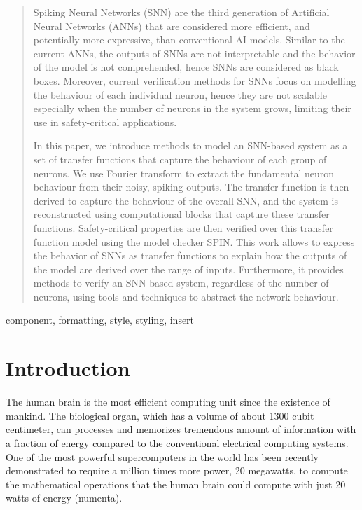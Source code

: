 \documentclass[conference]{IEEEtran}
\begin{document}
\begin{abstract}
Spiking Neural Networks (SNN) are the third generation of Artificial Neural Networks (ANNs) that are considered 
more efficient, and potentially more expressive, than conventional AI models. Similar to the current ANNs, the outputs of SNNs are not interpretable and the behavior of the model is not comprehended, hence SNNs are considered as black boxes.
Moreover, current verification methods for SNNs focus on modelling the behaviour of each individual neuron, hence they are not scalable especially when
the number of neurons in the system grows, limiting their use in safety-critical applications.
    
In this paper, we introduce methods to model an SNN-based
system as a set of transfer functions that capture the behaviour
of each group of neurons. We use Fourier transform to extract the
fundamental neuron behaviour from their noisy, spiking outputs. 
The transfer function is then derived to capture the behaviour of the overall SNN, 
and the system is reconstructed using computational blocks that capture these transfer functions. 
Safety-critical properties are then verified over this transfer function model using the model checker SPIN.
This work allows to express the behavior of SNNs as transfer functions to explain how the outputs of the model are derived over the range of inputs.
Furthermore, it provides methods to verify an SNN-based system, regardless of the number of neurons, using tools and techniques to abstract the network behaviour.
\end{abstract}

\begin{IEEEkeywords}
component, formatting, style, styling, insert
\end{IEEEkeywords}

\section{Introduction}
The human brain is the most efficient computing unit since the existence of mankind.
The biological organ, which has a volume of about 1300 cubit centimeter, can processes and memorizes tremendous amount of information with
a fraction of energy compared to the conventional electrical computing systems. One of the most powerful supercomputers in the world has been
recently demonstrated to require a million times more power, 20 megawatts, to compute the mathematical operations that the human brain could compute 
with just 20 watts of energy (numenta).
\end{document}
